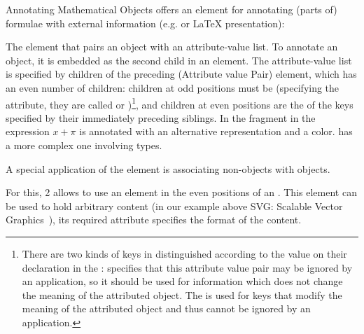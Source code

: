\begin{omgroup}[id=annotating]{Annotating Mathematical Objects}
  \openmath offers an element for annotating (parts of) formulae with external information
  (e.g. {\mathml} or {\LaTeX} presentation):

\begin{definition}[id=omattr.def]
  The {} element that pairs an {\openmath} object with an
  attribute-value list. To annotate an {\openmath} object, it is embedded as the second
  child in an  element. The attribute-value list is specified
  by children of the preceding {} (Attribute value Pair) element,
  which has an even number of children: children at odd positions must be
   (specifying the attribute, they are called  or
  )\footnote{There are two kinds of keys in {\openmath} distinguished
    according to the  value on their  declaration
    in the :  specifies
    that this attribute value pair may be ignored by an application, so it should be used
    for information which does not change the meaning of the attributed {\openmath}
    object. The  is used for keys that modify the meaning of the
    attributed {\openmath} object and thus cannot be ignored by an application.}, and
  children at even positions are the  of the keys specified by their
  immediately preceding siblings. In the {\openmath} fragment in {} the
  expression $x+\pi$ is annotated with an alternative representation and a color.
  {} has a more complex one involving types.
\end{definition}

A special application of the  element is associating
non-\openmath objects with \openmath objects.

\begin{definition}[id=omforeign.def]
  For this, {\openmath}2 allows to use an  element in the even
  positions of an . This element can be used to hold arbitrary
  {\xml} content (in our example above SVG: Scalable Vector Graphics~\cite{W3C:svg02}),
  its required  attribute specifies the format
  of the content.
\end{definition}


\end{omgroup}
